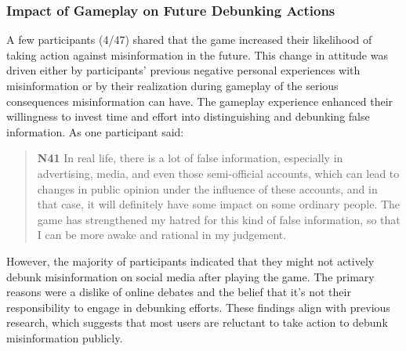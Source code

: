 

\subsubsection{Impact of Gameplay on Future Debunking Actions}
A few participants (4/47) shared that the game increased their likelihood of taking action against misinformation in the future. This change in attitude was driven either by participants' previous negative personal experiences with misinformation or by their realization during gameplay of the serious consequences misinformation can have.  The gameplay experience enhanced their willingness to invest time and effort into distinguishing and debunking false information. As one participant said:
\begin{quote}
\textbf{N41}
    In real life, there is a lot of false information, especially in advertising, media, and even those semi-official accounts, which can lead to changes in public opinion under the influence of these accounts, and in that case, it will definitely have some impact on some ordinary people. The game has strengthened my hatred for this kind of false information, so that I can be more awake and rational in my judgement.
\end{quote}

However, the majority of participants indicated that they might not actively debunk misinformation on social media after playing the game. The primary reasons were a dislike of online debates and the belief that it’s not their responsibility to engage in debunking efforts. These findings align with previous research, which suggests that most users are reluctant to take action to debunk misinformation publicly\cite{tang2024knows}.

